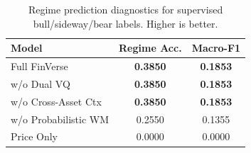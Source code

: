 \begin{table}[t]
\centering
\caption{Regime prediction diagnostics for supervised bull/sideway/bear labels. Higher is better.}
\label{tab:regime_prediction}
\begin{tabular}{lcc}
\toprule
Model & Regime Acc. & Macro-F1 \\
\midrule
Full FinVerse & \textbf{0.3850} & \textbf{0.1853} \\
w/o Dual VQ & \textbf{0.3850} & \textbf{0.1853} \\
w/o Cross-Asset Ctx & \textbf{0.3850} & \textbf{0.1853} \\
w/o Probabilistic WM & 0.2550 & 0.1355 \\
Price Only & 0.0000 & 0.0000 \\
\bottomrule
\end{tabular}
\end{table}
